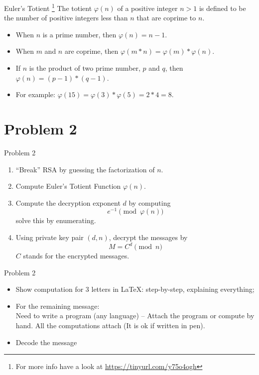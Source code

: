 \documentclass{beamer}
\begin{document}
\begin{frame}{Euler's Totient \footnote{For more info have a look at \url{https://tinyurl.com/y75o4ogh}}}
The totient $\varphi(n)$ of a positive integer $n > 1$ is defined to be the number of positive integers less than $n$ that are coprime to $n$. 
    \begin{itemize}
        \item When $n$ is a prime number, then $\varphi(n) = n - 1$.
        \item When $m$ and $n$ are coprime, then $\varphi(m*n) = \varphi(m) * \varphi(n)$.
        \item If $n$ is the product of two prime number, $p$ and $q$, then $\varphi(n) = (p - 1)*(q - 1)$.
        \item For example: $\varphi(15) = \varphi(3) * \varphi(5) = 2 * 4 = 8$.
      \end{itemize}
\end{frame}

\section{Problem 2}

\begin{frame}{Problem 2}
    \begin{enumerate}
        \item ``Break'' RSA by guessing the factorization of $n$.
        \item Compute Euler’s Totient Function $\varphi(n)$.
        \item Compute the decryption exponent $d$ by computing $$e^{-1} \pmod{\varphi(n)}$$ solve this by enumerating.
        \item Using private key pair $(d,n)$, decrypt the messages by $$ M = C^{d} \pmod n$$ $C$ stands for the encrypted messages.
      \end{enumerate}
\end{frame}

\begin{frame}{Problem 2}
    \begin{itemize}
        \item Show computation for 3 letters in \LaTeX: step-by-step, explaining everything;
        \item For the remaining message: \\
            Need to write a program (any language) -- Attach the program or compute by hand. All the computations attach (It is ok if written in pen).
        \item Decode the message
    \end{itemize}
\end{frame}
\end{document}
